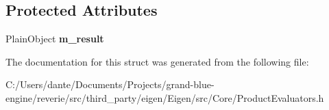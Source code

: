 \subsection*{Protected Attributes}
\begin{DoxyCompactItemize}
\item 
\mbox{\label{struct_eigen_1_1internal_1_1product__evaluator_3_01_product_3_01_lhs_00_01_rhs_00_01_options_01_34fdf849c0cc96fc7f8fe25f34362e65_ad998cb60cbc5104d7b38b51dcce2e40f}} 
Plain\+Object {\bfseries m\+\_\+result}
\end{DoxyCompactItemize}


The documentation for this struct was generated from the following file\+:\begin{DoxyCompactItemize}
\item 
C\+:/\+Users/dante/\+Documents/\+Projects/grand-\/blue-\/engine/reverie/src/third\+\_\+party/eigen/\+Eigen/src/\+Core/Product\+Evaluators.\+h\end{DoxyCompactItemize}
